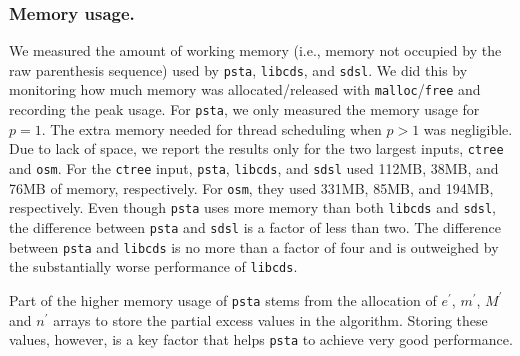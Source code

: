 \subsubsection{Memory usage.}
We measured the amount of working memory (i.e., memory not occupied by the raw
parenthesis sequence) used by {\tt psta}, {\tt libcds}, and {\tt sdsl}.
We did this by monitoring how much memory was allocated/released with
\texttt{malloc}/\texttt{free} and recording the peak usage.
For {\tt psta}, we only measured the memory usage for $p = 1$.
The extra memory needed for thread scheduling when $p > 1$ was negligible.
Due to lack of space, we report the results only for the two largest inputs,
{\tt ctree} and {\tt osm}.
For the {\tt ctree} input, {\tt psta}, {\tt libcds}, and {\tt sdsl} used 112MB,
38MB, and 76MB of memory, respectively.
For {\tt osm}, they used 331MB, 85MB, and 194MB, respectively.
Even though {\tt psta} uses more memory than both {\tt libcds} and {\tt sdsl},
the difference between {\tt psta} and {\tt sdsl} is a factor of less than two.
The difference between {\tt psta} and {\tt libcds} is no more than a factor of
four and is outweighed by the substantially worse performance of {\tt libcds}.

Part of the higher memory usage of {\tt psta} stems from the allocation of
$e^{\prime}$, $m^{\prime}$, $M^{\prime}$ and $n^{\prime}$ arrays to store the
partial excess values in the algorithm.
Storing these values, however, is a key factor that helps {\tt psta} to achieve
very good performance.
